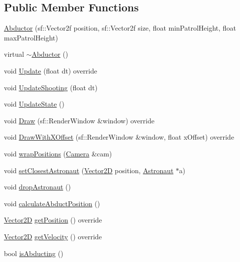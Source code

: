 \subsection*{Public Member Functions}
\begin{DoxyCompactItemize}
\item 
\hyperlink{class_abductor_ae0d55b9a8e855c02fe51fbb48613a4b7}{Abductor} (sf\+::\+Vector2f position, sf\+::\+Vector2f size, float min\+Patrol\+Height, float max\+Patrol\+Height)
\item 
virtual \hyperlink{class_abductor_adc657b211a1b36c55db079caa10d9010}{$\sim$\+Abductor} ()
\item 
void \hyperlink{class_abductor_a16c030380d94caf386171cda40ed1eb8}{Update} (float dt) override
\item 
void \hyperlink{class_abductor_a81e65919dcbdf472395f946d110825b2}{Update\+Shooting} (float dt)
\item 
void \hyperlink{class_abductor_aee5fadabe89f51885e51a08d4a2d9889}{Update\+State} ()
\item 
void \hyperlink{class_abductor_ab27e1580f1a11d483d97f028deda7370}{Draw} (sf\+::\+Render\+Window \&window) override
\item 
void \hyperlink{class_abductor_a6c68ecc2673674040f87c2409d8505a1}{Draw\+With\+X\+Offset} (sf\+::\+Render\+Window \&window, float x\+Offset) override
\item 
void \hyperlink{class_abductor_a4623b394ad899b8df96b52e997fa5b03}{wrap\+Positions} (\hyperlink{class_camera}{Camera} \&cam)
\item 
void \hyperlink{class_abductor_a3d6281a8a4ab08f7a01e358aa6c0ca7f}{set\+Closest\+Astronaut} (\hyperlink{class_vector2_d}{Vector2D} position, \hyperlink{class_astronaut}{Astronaut} $\ast$a)
\item 
void \hyperlink{class_abductor_a13164f20159447e3e50629283c7cd32d}{drop\+Astronaut} ()
\item 
void \hyperlink{class_abductor_a0c9d8d1e2978f6b794de34568baa266e}{calculate\+Abduct\+Position} ()
\item 
\hyperlink{class_vector2_d}{Vector2D} \hyperlink{class_abductor_a9b01cf2a2870454fe621a7bc5a2828e5}{get\+Position} () override
\item 
\hyperlink{class_vector2_d}{Vector2D} \hyperlink{class_abductor_adb812ea046ef9fc984b5035c7fb6ce3f}{get\+Velocity} () override
\item 
bool \hyperlink{class_abductor_a3a22e52687c4f1b70eba475617fec3a4}{is\+Abducting} ()
\item 

\end{DoxyCompactItemize}
